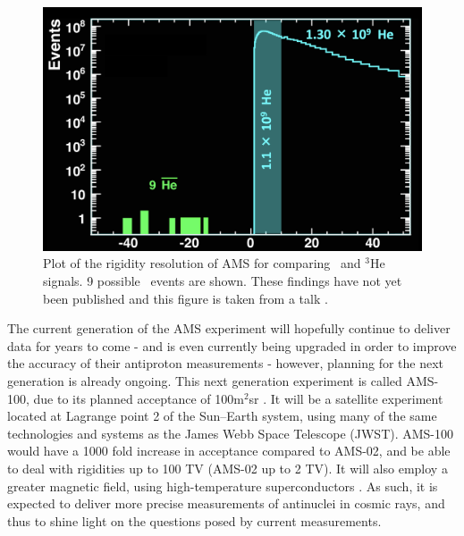 \begin{figure}
    \centering
    \includegraphics[width=\textwidth]{figures/AMS_he3bar_events_MIAPP.png}
    \caption{Plot of the rigidity resolution of AMS for comparing \ahe\ and $^3\mathrm{He}$ signals. 9 possible \ahe\ events are shown. These findings have not yet been published and this figure is taken from a talk \cite{MIAPP_AMS_dbar}.}
    \label{fig:AMS_MIAPP_talk_ahe}
\end{figure}

The current generation of the AMS experiment will hopefully continue to deliver data for years to come - and is even currently being upgraded in order to improve the accuracy of their antiproton measurements - however, planning for the next generation is already ongoing. This next generation experiment is called AMS-100, due to its planned acceptance of 100m$^2$sr \cite{AMS-100_TDR}. It will be a satellite experiment located at Lagrange point 2 of the Sun--Earth system, using many of the same technologies and systems as the James Webb Space Telescope (JWST). AMS-100 would have a 1000 fold increase in acceptance compared to AMS-02, and be able to deal with rigidities up to 100 TV (AMS-02 up to 2 TV). It will also employ a greater magnetic field, using high-temperature superconductors \cite{AMS-100_TDR}. As such, it is expected to deliver more precise measurements of antinuclei in cosmic rays, and thus to shine light on the questions posed by current measurements.\\

